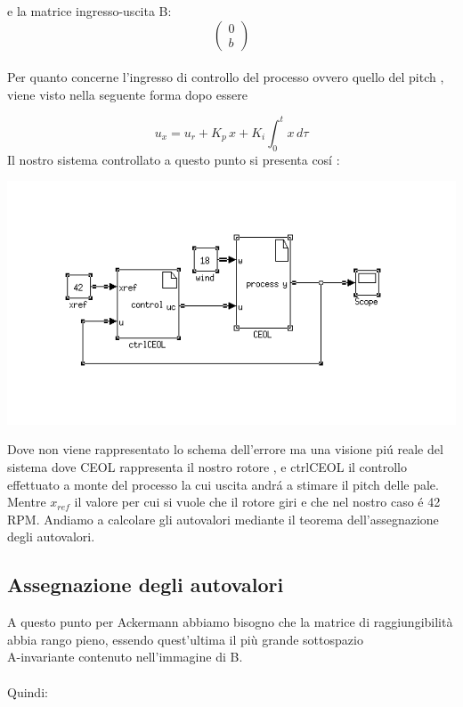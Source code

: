 \documentclass[a4paper,13pt]{article}
\begin{document}
	e la matrice ingresso-uscita B:          %
\begin{equation*}
\begin{pmatrix}

	0\\b

\end{pmatrix}
\end{equation*} \\

Per quanto concerne l'ingresso di controllo del processo ovvero quello del pitch ,
viene visto nella seguente forma dopo essere

	
\begin{equation*}
	u_x=u_r+K_{p}\,x+K_{i}\int_{0}^{t} x \, d\tau              %
\end{equation*}	
Il nostro sistema controllato a questo punto si presenta cos\'i :

\begin{center}
\includegraphics[scale=0.6]{eolcont.png}
\end{center}

Dove non viene rappresentato lo schema dell'errore ma una visione pi\'u reale del sistema
dove CEOL rappresenta il nostro rotore , e ctrlCEOL il controllo effettuato a monte del processo la cui uscita andr\'a a stimare il pitch delle pale.\\
Mentre $x_{ref}$ il valore per cui si vuole che il rotore giri e che nel nostro caso \'e 42 RPM.
Andiamo a calcolare gli autovalori mediante il teorema dell'assegnazione degli autovalori.
\subsection{Assegnazione degli autovalori}
A questo punto per Ackermann abbiamo bisogno che la matrice di raggiungibilità abbia rango pieno, essendo quest'ultima 	il più grande sottospazio \\A-invariante contenuto nell'immagine di B.\\ \\
	Quindi:
	
\end{document}
